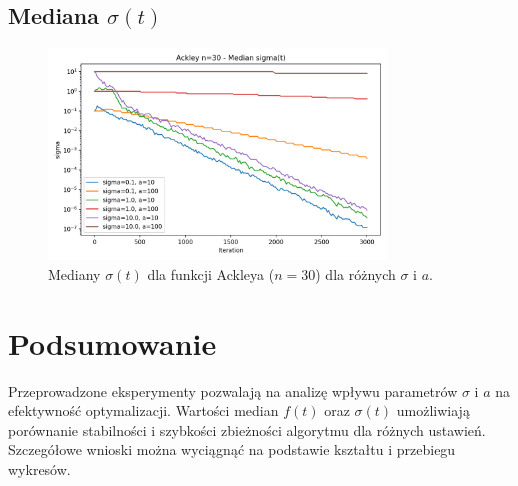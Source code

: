 \documentclass[a4paper,12pt]{article}
\begin{document}
\subsection{Mediana $\sigma(t)$}
\begin{figure}[H]
    \centering
    \includegraphics[width=0.8\textwidth]{charts/Ackley_n30_all_sigmas.png}
    \caption{Mediany $\sigma(t)$ dla funkcji Ackleya ($n=30$) dla różnych $\sigma$ i $a$.}
\end{figure}

\newpage
\section{Podsumowanie}
Przeprowadzone eksperymenty pozwalają na analizę wpływu parametrów $\sigma$ i $a$ na efektywność optymalizacji. Wartości median $f(t)$ oraz $\sigma(t)$ umożliwiają porównanie stabilności i szybkości zbieżności algorytmu dla różnych ustawień. Szczegółowe wnioski można wyciągnąć na podstawie kształtu i przebiegu wykresów.
\end{document}
